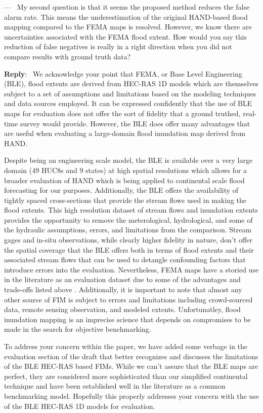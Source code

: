 \documentclass[11pt]{article}
\newcounter{reviewer}
\newcounter{point}[reviewer]
\renewcommand{\thepoint}{P\,\thereviewer.\arabic{point}}
\newenvironment{point}
   {\refstepcounter{point} \bigskip \noindent {\textbf{Reviewer~Point~\thepoint} } ---\ }
   {\par }
\newenvironment{reply}
   {\medskip \noindent \begin{sf}\textbf{Reply}:\  }
   {\medskip \end{sf}}
\begin{document}
\begin{point}
My second question is that it seems the proposed method reduces the false alarm rate.
This means the underestimation of the original HAND-based flood mapping compared to the FEMA maps is resolved.
However, we know there are uncertainties associated with the FEMA flood extent.
How would you say this reduction of false negatives is really in a right direction when you did not compare results with ground truth data?
    \label{pt:bar}
\end{point}

\begin{reply}
We acknowledge your point that FEMA, or Base Level Engineering (BLE), flood extents are derived from HEC-RAS 1D models which are themselves subject to a set of assumptions and limitations based on the modeling techniques and data sources employed.
It can be expressed confidently that the use of BLE maps for evaluation does not offer the sort of fidelity that a ground truthed, real-time survey would provide.
However, the BLE does offer many advantages that are useful when evaluating a large-domain flood inundation map derived from HAND. 

Despite being an engineering scale model, the BLE is available over a very large domain (49 HUC8s and 9 states) at high spatial resolutions which allows for a broader evaluation of HAND which is being applied to continental scale flood forecasting for our purposes.
Additionally, the BLE offers the availability of tightly spaced cross-sections that provide the stream flows used in making the flood extents.
This high resolution dataset of stream flows and inundation extents provides the opportunity to remove the meterological, hydrological, and some of the hydraulic assumptions, errors, and limitations from the comparison.
Stream gages and in-situ observations, while clearly higher fidelity in nature, don't offer the spatial coverage that the BLE offers both in terms of flood extents and their associated stream flows that can be used to detangle confounding factors that introduce errors into the evaluation.
Nevertheless, FEMA maps have a storied use in the literature as an evaluation dataset due to some of the advantages and trade-offs listed above \cite{cook2009effect,rajib2016large,zheng2018geoflood,afshari2018comparison,wing2017validation,criss2022stage,follum2017autorapid}.
Additionally, it is important to note that almost any other source of FIM is subject to errors and limitations including crowd-sourced data, remote sensing observation, and modeled extents.
Unfortunatley, flood inundation mapping is an imprecise science that depends on compromises to be made in the search for objective benchmarking.

To address your concern within the paper, we have added some verbage in the evaluation section of the draft that better recognizes and discusses the limitations of the BLE HEC-RAS based FIMs.
While we can't assure that the BLE maps are perfect, they are considered more sophisticated than our simplified continental technique and have been established well in the literature as a common benchmarking model.
Hopefully this properly addresses your concern with the use of the BLE HEC-RAS 1D models for evaluation.
\end{reply}
\end{document}
